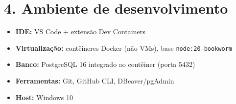 \documentclass[a4paper,12pt]{article}
\begin{document}
\section*{4. Ambiente de desenvolvimento}

\begin{itemize}[nosep]
    \item \textbf{IDE:} VS Code + extensão Dev Containers
    \item \textbf{Virtualização:} contêineres Docker (não VMs), base \texttt{node:20-bookworm}
    \item \textbf{Banco:} PostgreSQL 16 integrado ao contêiner (porta 5432)
    \item \textbf{Ferramentas:} Git, GitHub CLI, DBeaver/pgAdmin
    \item \textbf{Host:} Windows 10
\end{itemize}
\end{document}
